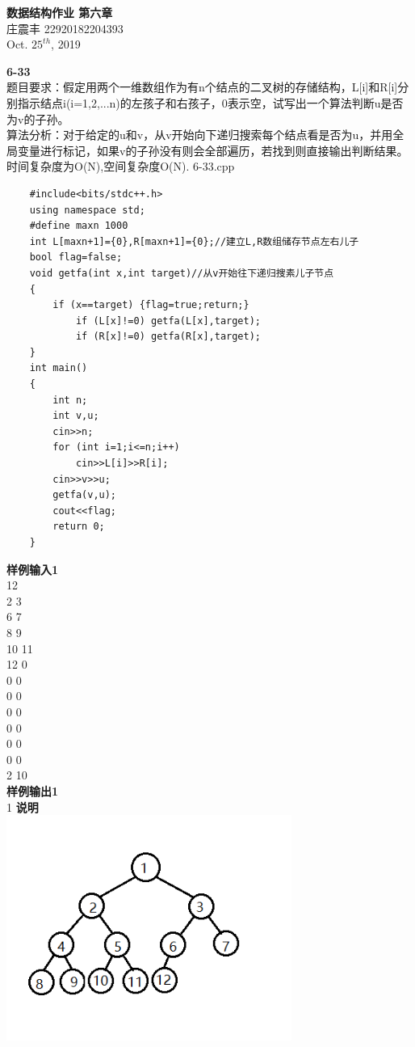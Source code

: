 \documentclass[UTF8,a4paper]{article}
\begin{document}
\begin{center}
    \textbf{\LARGE{数据结构作业 第六章}}\\[0.5cm]
    \normalsize{庄震丰 22920182204393}\\[0.3cm]
    \large{Oct. $25^{th}$, 2019}
\end{center}
\textbf{6-33}\\
    题目要求：假定用两个一维数组作为有n个结点的二叉树的存储结构，L[i]和R[i]分别指示结点i(i=1,2,...n)的左孩子和右孩子，0表示空，试写出一个算法判断u是否为v的子孙。\\
	算法分析：对于给定的u和v，从v开始向下递归搜索每个结点看是否为u，并用全局变量进行标记，如果v的子孙没有则会全部遍历，若找到则直接输出判断结果。
	\\
	时间复杂度为O(N),空间复杂度O(N).
	6-33.cpp
\begin{lstlisting}
	#include<bits/stdc++.h>
	using namespace std;
	#define maxn 1000
	int L[maxn+1]={0},R[maxn+1]={0};//建立L,R数组储存节点左右儿子
	bool flag=false;
	void getfa(int x,int target)//从v开始往下递归搜素儿子节点
	{
		if (x==target) {flag=true;return;}
			if (L[x]!=0) getfa(L[x],target);
			if (R[x]!=0) getfa(R[x],target);
	}
	int main()
	{
		int n;
		int v,u;
		cin>>n;
		for (int i=1;i<=n;i++)
			cin>>L[i]>>R[i];
		cin>>v>>u;
		getfa(v,u); 
		cout<<flag;
		return 0;
	}
\end{lstlisting}
\textbf{样例输入1}\\
12\\
2 3\\
6 7\\
8 9\\
10 11\\
12 0\\
0 0\\
0 0\\
0 0\\
0 0\\
0 0\\
0 0\\
2 10\\
\textbf{样例输出1}\\
1
\textbf{说明}\\
\includegraphics[width=0.7\textwidth]{6-33.png}\\
\end{document}
